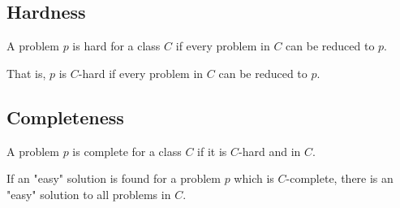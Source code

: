 
\subsection{Hardness}

A problem \(p\) is hard for a class \(C\) if every problem in \(C\) can be reduced to \(p\).

That is, \(p\) is \(C\)-hard if every problem in \(C\) can be reduced to \(p\).


\subsection{Completeness}

A problem \(p\) is complete for a class \(C\) if it is \(C\)-hard and in \(C\).

If an "easy" solution is found for a problem \(p\) which is \(C\)-complete, there is an "easy" solution to all problems in \(C\).
